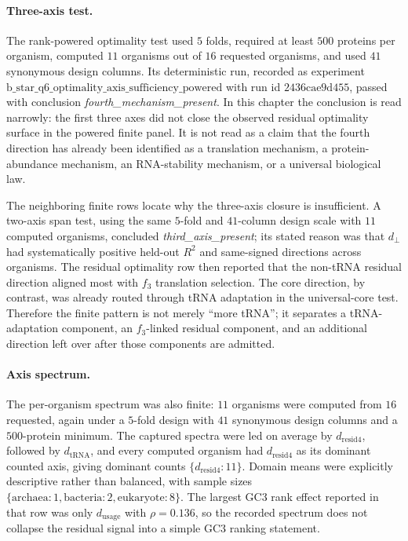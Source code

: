 \paragraph{Three-axis test.}
The rank-powered optimality test used $5$ folds, required at least $500$ proteins per organism, computed $11$ organisms out of $16$ requested organisms, and used $41$ synonymous design columns.  Its deterministic run, recorded as experiment $\mathrm{b\_star\_q6\_optimality\_axis\_sufficiency\_powered}$ with run id $2436\mathrm{cae}9\mathrm{d}455$, passed with conclusion \emph{fourth\_mechanism\_present}.  In this chapter the conclusion is read narrowly: the first three axes did not close the observed residual optimality surface in the powered finite panel.  It is not read as a claim that the fourth direction has already been identified as a translation mechanism, a protein-abundance mechanism, an RNA-stability mechanism, or a universal biological law.

The neighboring finite rows locate why the three-axis closure is insufficient.  A two-axis span test, using the same $5$-fold and $41$-column design scale with $11$ computed organisms, concluded \emph{third\_axis\_present}; its stated reason was that $d_\perp$ had systematically positive held-out $R^2$ and same-signed directions across organisms.  The residual optimality row then reported that the non-tRNA residual direction aligned most with $f_3$ translation selection.  The core direction, by contrast, was already routed through tRNA adaptation in the universal-core test.  Therefore the finite pattern is not merely ``more tRNA''; it separates a tRNA-adaptation component, an $f_3$-linked residual component, and an additional direction left over after those components are admitted.

\paragraph{Axis spectrum.}
The per-organism spectrum was also finite: $11$ organisms were computed from $16$ requested, again under a $5$-fold design with $41$ synonymous design columns and a $500$-protein minimum.  The captured spectra were led on average by $d_{\mathrm{resid4}}$, followed by $d_{\mathrm{tRNA}}$, and every computed organism had $d_{\mathrm{resid4}}$ as its dominant counted axis, giving dominant counts $\{d_{\mathrm{resid4}}:11\}$.  Domain means were explicitly descriptive rather than balanced, with sample sizes $\{\mathrm{archaea}:1,\mathrm{bacteria}:2,\mathrm{eukaryote}:8\}$.  The largest GC3 rank effect reported in that row was only $d_{\mathrm{usage}}$ with $\rho=0.136$, so the recorded spectrum does not collapse the residual signal into a simple GC3 ranking statement.

